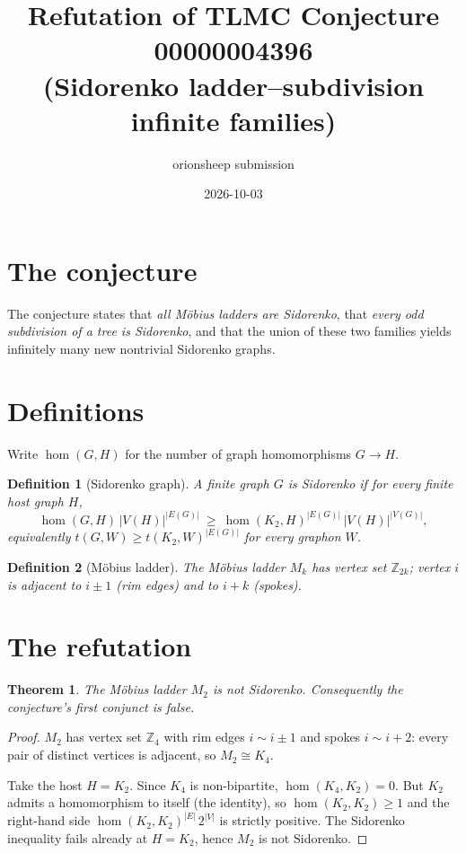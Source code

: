 \documentclass[11pt]{article}
\title{Refutation of TLMC Conjecture 00000004396\\
\large (Sidorenko ladder--subdivision infinite families)}
\author{orionsheep submission}
\date{2026-10-03}
\newtheorem{theorem}{Theorem}
\newtheorem{definition}{Definition}
\begin{document}
\maketitle

\section{The conjecture}
The conjecture states that \emph{all M\"obius ladders are Sidorenko}, that
\emph{every odd subdivision of a tree is Sidorenko}, and that the union of
these two families yields infinitely many new nontrivial Sidorenko graphs.

\section{Definitions}
Write $\hom(G,H)$ for the number of graph homomorphisms $G\to H$.
\begin{definition}[Sidorenko graph]
A finite graph $G$ is \emph{Sidorenko} if for every finite host graph $H$,
\[
  \hom(G,H)\,|V(H)|^{|E(G)|}\ \ge\ \hom(K_2,H)^{|E(G)|}\,|V(H)|^{|V(G)|},
\]
equivalently $t(G,W)\ge t(K_2,W)^{|E(G)|}$ for every graphon $W$.
\end{definition}
\begin{definition}[M\"obius ladder]
The M\"obius ladder $M_k$ has vertex set $\mathbb Z_{2k}$; vertex $i$ is
adjacent to $i\pm1$ (rim edges) and to $i+k$ (spokes).
\end{definition}

\section{The refutation}
\begin{theorem}
The M\"obius ladder $M_2$ is not Sidorenko. Consequently the conjecture's
first conjunct is false.
\end{theorem}
\begin{proof}
$M_2$ has vertex set $\mathbb Z_4$ with rim edges $i\sim i\pm1$ and spokes
$i\sim i+2$: every pair of distinct vertices is adjacent, so $M_2\cong K_4$.

Take the host $H=K_2$.  Since $K_4$ is non-bipartite,
$\hom(K_4,K_2)=0$.  But $K_2$ admits a homomorphism to itself (the
identity), so $\hom(K_2,K_2)\ge1$ and the right-hand side
$\hom(K_2,K_2)^{|E|}\,2^{|V|}$ is strictly positive.  The Sidorenko
inequality fails already at $H=K_2$, hence $M_2$ is not Sidorenko.
\end{proof}
\end{document}
